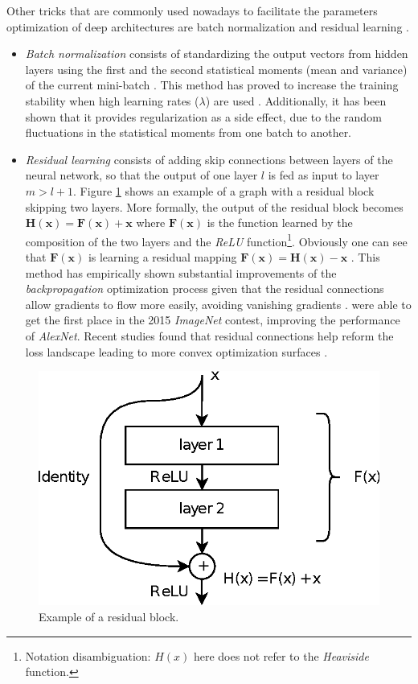 Other tricks that are commonly used nowadays to facilitate the parameters optimization of deep architectures are batch normalization \autocite{ioffe2015} and residual learning \autocite{kaiming2016}. 
\begin{itemize}
	\item \textit{Batch normalization} consists of standardizing the output vectors from hidden layers using the first and the second statistical moments (mean and variance) of the current mini-batch \autocite{ioffe2015}. This method has proved to increase the training stability when high learning rates ($\lambda$) are used \autocite{Goodfellow2016}. Additionally, it has been shown that it provides regularization \autocite{dauphin2021} as a side effect, due to the random fluctuations in the statistical moments from one batch to another.
	\item \textit{Residual learning} consists of adding skip connections between layers of the neural network, so that the output of one layer $l$ is fed as input to layer $m > l+1$. Figure \ref{fig:residual} shows an example of a graph with a residual block skipping two layers. More formally, the output of the residual block becomes $\mathbf{H(x)} = \mathbf{F(x)} + \mathbf{x}$ where $\mathbf{F(x)}$ is the function learned by the composition of the two layers and the \textit{ReLU} function\footnote{Notation disambiguation: $H(x)$ here does not refer to the \textit{Heaviside} function.}. Obviously one can see that $\mathbf{F(x)}$ is learning a residual mapping $\mathbf{F(x)} = \mathbf{H(x)} - \mathbf{x}$ \autocite{kaiming2016}. This method has empirically shown substantial improvements of the \textit{backpropagation} optimization process given that the residual connections allow gradients to flow more easily, avoiding vanishing gradients \autocite{Goodfellow2016}. \citealp{kaiming2016} were able to get the first place in the 2015 \textit{ImageNet} contest, improving the performance of \textit{AlexNet}. Recent studies found that residual connections help reform the loss landscape leading to more convex optimization surfaces \autocite{freeman2017, wang2020a}.
\end{itemize}
 


\begin{figure}[h!]
	\centering
	\includegraphics[width=0.5\linewidth]{background/images/residual}
	\caption[Example of a residual block]{Example of a residual block.}
	\label{fig:residual}
\end{figure}


